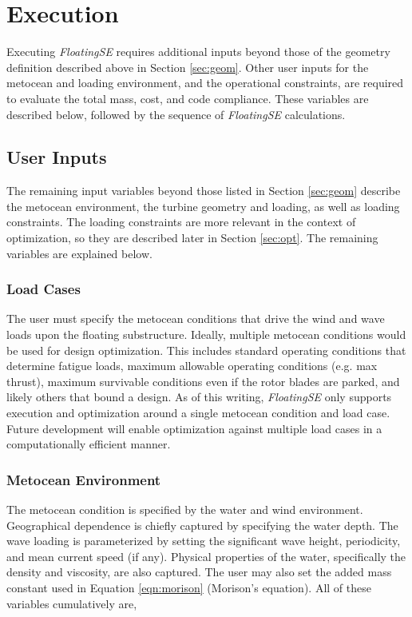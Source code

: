 
\section{Execution}
\label{sec:exec}
Executing \textit{FloatingSE} requires additional inputs beyond those of
the geometry definition described above in Section \ref{sec:geom}.
Other user inputs for the metocean and loading environment, and the
operational constraints, are required to evaluate the total mass, cost,
and code compliance.  These variables are described below, followed by
the sequence of \textit{FloatingSE} calculations.

\subsection{User Inputs}
The remaining input variables beyond those listed in Section
\ref{sec:geom} describe the metocean environment, the turbine geometry
and loading, as well as loading constraints.  The loading constraints
are more relevant in the context of optimization, so they are described
later in Section \ref{sec:opt}.  The remaining variables are explained
below.

\subsubsection{Load Cases}
The user must specify the metocean conditions that drive the wind and
wave loads upon the floating substructure.  Ideally, multiple metocean
conditions would be used for design optimization.  This includes
standard operating conditions that determine fatigue loads, maximum
allowable operating conditions (e.g. max thrust), maximum survivable
conditions even if the rotor blades are parked, and likely others that
bound a design.  As of this writing, \textit{FloatingSE} only supports
execution and optimization around a single metocean condition and load
case.  Future development will enable optimization against multiple load
cases in a computationally efficient manner.

\subsubsection{Metocean Environment}
The metocean condition is specified by the water and wind environment.
Geographical dependence is chiefly captured by specifying the water
depth.  The wave loading is parameterized by setting the significant
wave height, periodicity, and mean current speed (if any).  Physical
properties of the water, specifically the density and viscosity, are
also captured.  The user may also set the added mass constant used in
Equation \ref{eqn:morison} (Morison's equation).  All of these variables
cumulatively are,

